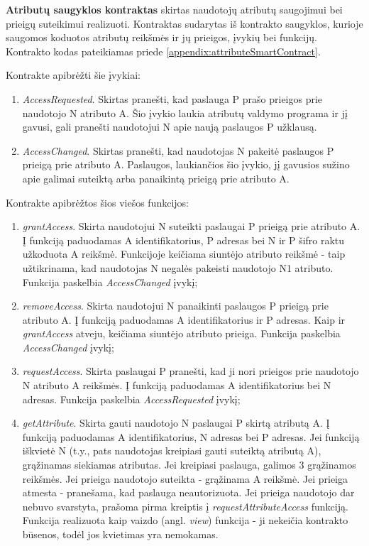\textbf{Atributų saugyklos kontraktas} skirtas naudotojų atributų saugojimui bei prieigų suteikimui realizuoti. Kontraktas sudarytas iš kontrakto saugyklos,
kurioje saugomos koduotos atributų reikšmės ir jų prieigos, įvykių bei funkcijų.
Kontrakto kodas pateikiamas priede \hypertarget{appendix:attributeSmartContract}{\ref{appendix:attributeSmartContract}}.

Kontrakte apibrėžti šie įvykiai:

\begin{enumerate}
    \item \textit{AccessRequested}. Skirtas pranešti, kad paslauga P prašo prieigos prie naudotojo N atributo A. Šio įvykio laukia
    atributų valdymo programa ir jį gavusi, gali pranešti naudotojui N apie naują paslaugos P užklausą.
    \item \textit{AccessChanged}. Skirtas pranešti, kad naudotojas N pakeitė paslaugos P prieigą prie atributo A. Paslaugos, 
    laukiančios šio įvykio, jį gavusios sužino apie galimai suteiktą arba panaikintą prieigą prie atributo A.
\end{enumerate}

Kontrakte apibrėžtos šios viešos funkcijos:

\begin{enumerate}
    \item \textit{grantAccess}. Skirta naudotojui N suteikti paslaugai P prieigą prie atributo A. Į funkciją paduodamas A identifikatorius,
    P adresas bei N ir P šifro raktu užkoduota A reikšmė. Funkcijoje keičiama siuntėjo atributo reikšmė - taip užtikrinama, kad naudotojas N
    negalės pakeisti naudotojo N1 atributo. Funkcija paskelbia \textit{AccessChanged} įvykį;
    \item \textit{removeAccess}. Skirta naudotojui N panaikinti paslaugos P prieigą prie atributo A. Į funkciją paduodamas A identifikatorius ir P
    adresas. Kaip ir \textit{grantAccess} atveju, keičiama siuntėjo atributo prieiga. Funkcija paskelbia \textit{AccessChanged} įvykį;
    \item \textit{requestAccess}. Skirta paslaugai P pranešti, kad ji nori prieigos prie naudotojo N atributo A reikšmės. Į funkciją paduodamas A identifikatorius
    bei N adresas. Funkcija paskelbia \textit{AccessRequested} įvykį;
    \item \textit{getAttribute}. Skirta gauti naudotojo N paslaugai P skirtą atributą A. Į funkciją paduodamas A identifikatorius, N adresas bei
    P adresas. Jei funkciją iškvietė N (t.y., pats naudotojas kreipiasi gauti suteiktą atributą A), grąžinamas siekiamas atributas. Jei kreipiasi paslauga,
    galimos 3 grąžinamos reikšmės. Jei prieiga naudotojo suteikta - grąžinama A reikšmė. Jei prieiga atmesta - pranešama, kad paslauga neautorizuota. Jei
    prieiga naudotojo dar nebuvo svarstyta, prašoma pirma kreiptis į \textit{requestAttributeAccess} funkciją.\\
    Funkcija realizuota kaip vaizdo (angl. \textit{view}) funkcija - ji nekeičia kontrakto būsenos, todėl jos kvietimas yra nemokamas.
\end{enumerate}


